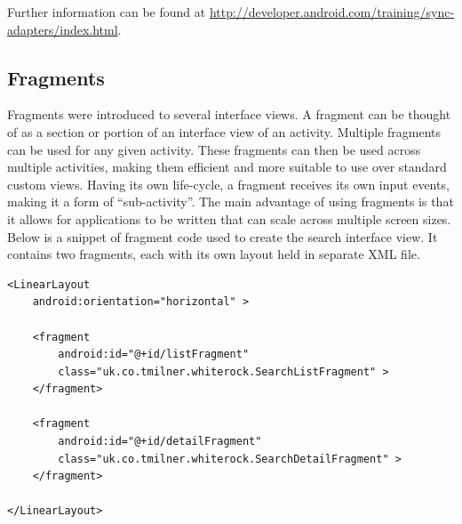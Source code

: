 \documentclass[11pt,a4paper]{article}
\begin{document}
Further information can be found at \url{http://developer.android.com/training/sync-adapters/index.html}.

\subsection{Fragments}
\label{sec:fragments}
Fragments were introduced to several interface views. A fragment can be thought of as a section or portion of an interface view of an activity. Multiple fragments can be used for any given activity. These fragments can then be used across multiple activities, making them efficient and more suitable to use over standard custom views. Having its own life-cycle, a fragment receives its own input events, making it a form of ``sub-activity''. The main advantage of using fragments is that it allows for applications to be written that can scale across multiple screen sizes. Below is a snippet of fragment code used to create the search interface view. It contains two fragments, each with its own layout held in separate XML file.

\begin{lstlisting}[captionpos=b, caption=Fragment Code Snippet, label=lst:Fragment Code Snippet, frame=single]
<LinearLayout
    android:orientation="horizontal" >

    <fragment
        android:id="@+id/listFragment"
        class="uk.co.tmilner.whiterock.SearchListFragment" >
    </fragment>

    <fragment
        android:id="@+id/detailFragment"
        class="uk.co.tmilner.whiterock.SearchDetailFragment" >
    </fragment>

</LinearLayout>
\end{lstlisting}
\end{document}
